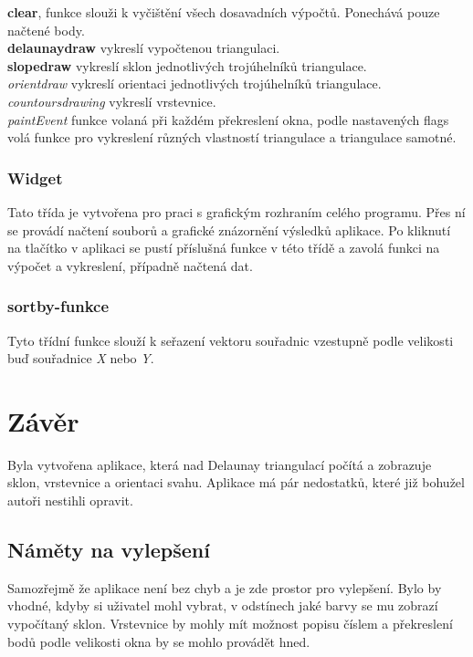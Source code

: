 \documentclass{article}
\begin{document}
\textbf{clear}, funkce slouži k vyčištění všech dosavadních výpočtů. Ponechává pouze načtené body. \\

\textbf{delaunaydraw} vykreslí vypočtenou triangulaci. \\
\textbf{slopedraw} vykreslí sklon jednotlivých trojúhelníků triangulace. \\
\textit{orientdraw} vykreslí orientaci jednotlivých trojúhelníků triangulace. \\
\textit{countoursdrawing} vykreslí vrstevnice. \\
\textit{paintEvent} funkce volaná při každém překreslení okna, podle nastavených flags volá funkce pro vykreslení různých vlastností triangulace a triangulace samotné. \\

\subsubsection{Widget} 

Tato třída je vytvořena pro praci s grafickým rozhraním celého programu. Přes ní se provádí načtení souborů a grafické znázornění výsledků aplikace. Po kliknutí na tlačítko v aplikaci se pustí příslušná funkce v této třídě a zavolá funkci na výpočet a vykreslení, případně načtená dat.\\ 

\subsubsection{sortby-funkce}
Tyto třídní funkce slouží k seřazení vektoru souřadnic vzestupně podle velikosti buď souřadnice \textit{X} nebo \textit{Y}.

\section{Závěr}
Byla vytvořena aplikace, která nad Delaunay triangulací počítá a zobrazuje sklon, vrstevnice a orientaci svahu. Aplikace má pár nedostatků, které již bohužel autoři nestihli opravit.
	\subsection{Náměty na vylepšení} %
Samozřejmě že aplikace není bez chyb a je zde prostor pro vylepšení. Bylo by vhodné, kdyby si uživatel mohl vybrat, v odstínech jaké barvy se mu zobrazí vypočítaný sklon. Vrstevnice by mohly mít možnost popisu číslem a překreslení bodů podle velikosti okna by se mohlo provádět hned.
	

\clearpage

\end{document}

